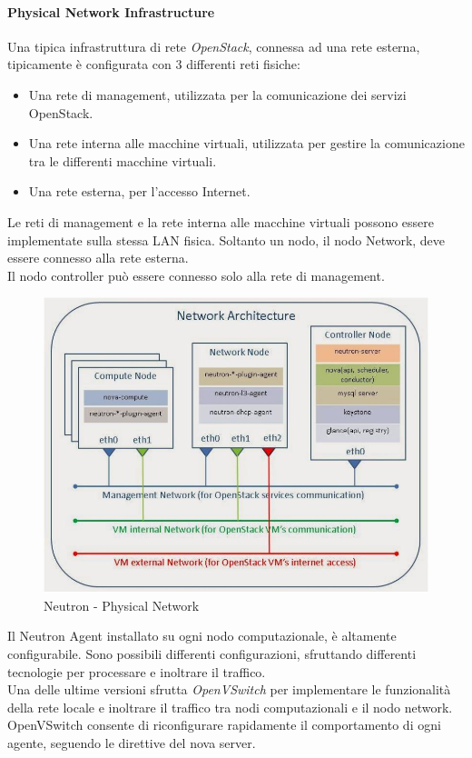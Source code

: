 \documentclass{article}
\begin{document}
\paragraph{Physical Network Infrastructure}
Una tipica infrastruttura di rete \textit{OpenStack}, connessa ad una rete esterna, tipicamente è configurata con 3 differenti reti fisiche:
\begin{itemize}
    \item Una rete di management, utilizzata per la comunicazione dei servizi OpenStack.
    \item Una rete interna alle macchine virtuali, utilizzata per gestire la comunicazione tra le differenti macchine virtuali.
    \item Una rete esterna, per l'accesso Internet.
\end{itemize}
Le reti di management e la rete interna alle macchine virtuali possono essere implementate sulla stessa LAN fisica. Soltanto un nodo, il nodo Network, deve essere connesso alla rete esterna. \\
Il nodo controller può essere connesso solo alla rete di management.
\begin{figure}[H]
    \centering
    \includegraphics[scale=0.5]{img/neutron physical network.png}
    \caption{Neutron - Physical Network}
\end{figure}\noindent
Il Neutron Agent installato su ogni nodo computazionale, è altamente configurabile. Sono possibili differenti configurazioni, sfruttando differenti tecnologie per processare e inoltrare il traffico. \\ 
Una delle ultime versioni sfrutta \textit{OpenVSwitch} per implementare le funzionalità della rete locale e inoltrare il traffico tra nodi computazionali e il nodo network. OpenVSwitch consente di riconfigurare rapidamente il comportamento di ogni agente, seguendo le direttive del nova server.
\end{document}
